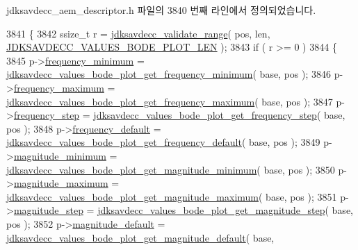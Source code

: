 jdksavdecc\+\_\+aem\+\_\+descriptor.\+h 파일의 3840 번째 라인에서 정의되었습니다.


\begin{DoxyCode}
3841 \{
3842     ssize\_t r = \hyperlink{group__util_ga9c02bdfe76c69163647c3196db7a73a1}{jdksavdecc\_validate\_range}( pos, len, 
      \hyperlink{group__values__bode__plot_gac4af7f3202cb861443874d22de9776b0}{JDKSAVDECC\_VALUES\_BODE\_PLOT\_LEN} );
3843     \textcolor{keywordflow}{if} ( r >= 0 )
3844     \{
3845         p->\hyperlink{structjdksavdecc__values__bode__plot_ac2f4b33e27fd68491ba8c615184f45b1}{frequency\_minimum} = 
      \hyperlink{group__values__bode__plot_ga08397b0195112d93bebde35aa55513ad}{jdksavdecc\_values\_bode\_plot\_get\_frequency\_minimum}( base, 
      pos );
3846         p->\hyperlink{structjdksavdecc__values__bode__plot_a9a9464d23652680945738ee57530d4c9}{frequency\_maximum} = 
      \hyperlink{group__values__bode__plot_gaaba2c0b4015b8af9d1a1544b471ad8f8}{jdksavdecc\_values\_bode\_plot\_get\_frequency\_maximum}( base, 
      pos );
3847         p->\hyperlink{structjdksavdecc__values__bode__plot_ac6660c43196c54a294ec3f38667a2c54}{frequency\_step} = 
      \hyperlink{group__values__bode__plot_ga9c15ecf092f10c2a1c179d73d09ee0e3}{jdksavdecc\_values\_bode\_plot\_get\_frequency\_step}( base, pos );
3848         p->\hyperlink{structjdksavdecc__values__bode__plot_acf954095c1b3ebf63d5aee12a9193b77}{frequency\_default} = 
      \hyperlink{group__values__bode__plot_gac302033b82efb10723968fff4af183f9}{jdksavdecc\_values\_bode\_plot\_get\_frequency\_default}( base, 
      pos );
3849         p->\hyperlink{structjdksavdecc__values__bode__plot_ad49b5753eec6d1f52031437ff3aebd32}{magnitude\_minimum} = 
      \hyperlink{group__values__bode__plot_ga572623f6c98a5b0893311392bd99c1c2}{jdksavdecc\_values\_bode\_plot\_get\_magnitude\_minimum}( base, 
      pos );
3850         p->\hyperlink{structjdksavdecc__values__bode__plot_ad232dbbda4bd135bc57d846cfe82c60f}{magnitude\_maximum} = 
      \hyperlink{group__values__bode__plot_ga1b3dc7057b2019b21f22d8ff79fc830c}{jdksavdecc\_values\_bode\_plot\_get\_magnitude\_maximum}( base, 
      pos );
3851         p->\hyperlink{structjdksavdecc__values__bode__plot_a1ce8f90a7972ff2257328d8616e98e51}{magnitude\_step} = 
      \hyperlink{group__values__bode__plot_ga61030f44a4b7b614f42f5faf830eed66}{jdksavdecc\_values\_bode\_plot\_get\_magnitude\_step}( base, pos );
3852         p->\hyperlink{structjdksavdecc__values__bode__plot_afaf35eb351724eb0b20277d519ed7d38}{magnitude\_default} = 
      \hyperlink{group__values__bode__plot_gac495e0f41eac0af578ed2521774fb1e9}{jdksavdecc\_values\_bode\_plot\_get\_magnitude\_default}( base, 

\end{DoxyCode}
